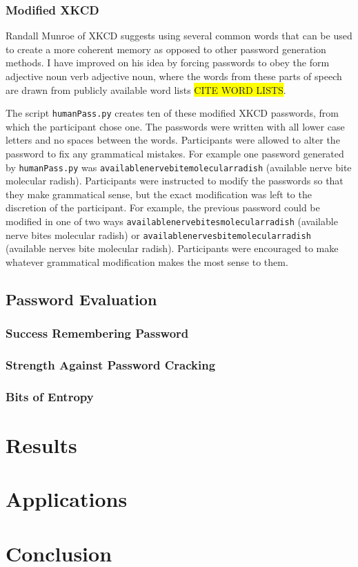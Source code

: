 \documentclass{article}
\newcommand{\hl}[1]
{\colorbox{yellow}{#1}}
\begin{document}
\subsubsection*{Modified XKCD}
Randall Munroe of XKCD suggests using several common words that can be used to create a more coherent memory as opposed to other password generation methods. I have improved on his idea by forcing passwords to obey the form adjective noun verb adjective noun, where the words from these parts of speech are drawn from publicly available word lists \hl{CITE WORD LISTS}.

The script \texttt{humanPass.py} creates ten of these modified XKCD passwords, from which the participant chose one. The passwords were written with all lower case letters and no spaces between the words. Participants were allowed to alter the password to fix any grammatical mistakes. For example one password generated by \texttt{humanPass.py} was \texttt{availablenervebitemolecularradish} (available nerve bite molecular radish). Participants were instructed to modify the passwords so that they make grammatical sense, but the exact modification was left to the discretion of the participant. For example, the previous password could be modified in one of two ways \texttt{availablenervebitesmolecularradish} (available nerve bites molecular radish) or \texttt{availablenervesbitemolecularradish} (available nerves bite molecular radish). Participants were encouraged to make whatever grammatical modification makes the most sense to them.

\subsection*{Password Evaluation}
\subsubsection*{Success Remembering Password}
\subsubsection*{Strength Against Password Cracking}
\subsubsection*{Bits of Entropy}



\section*{Results}

\section*{Applications}

\section*{Conclusion}
\end{document}
